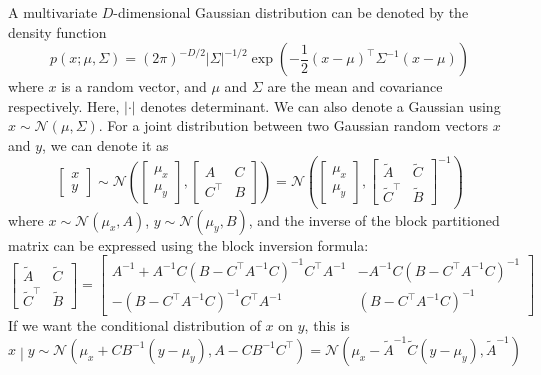 \documentclass[11pt]{report} %
\begin{document}
A multivariate $D$-dimensional Gaussian distribution can be denoted by the density function
\begin{equation}
p\left(x;\mu,\Sigma\right)=\left(2\pi\right)^{-D/2}\left|\Sigma\right|^{-1/2}\exp\left(-\dfrac{1}{2}\left(x-\mu\right)^{\top}\Sigma^{-1}\left(x-\mu\right)\right)
\end{equation}
where $x$ is a random vector, and $\mu$ and $\Sigma$ are the mean and covariance respectively. Here, $\left|\cdot\right|$ denotes determinant. We can also denote a Gaussian using $x\sim\mathcal{N}\left(\mu, \Sigma\right)$. For a joint distribution between two Gaussian random vectors $x$ and $y$, we can denote it as
\begin{equation}
\begin{bmatrix}x\\
y
\end{bmatrix}\sim\mathcal{N}\left(\begin{bmatrix}\mu_{x}\\
\mu_{y}
\end{bmatrix},\begin{bmatrix}A & C\\
C^{\top} & B
\end{bmatrix}\right)=\mathcal{N}\left(\begin{bmatrix}\mu_{x}\\
\mu_{y}
\end{bmatrix},\begin{bmatrix}\tilde{A} & \tilde{C}\\
\tilde{C}^{\top} & \tilde{B}
\end{bmatrix}^{-1}\right)
\end{equation}
where $x\sim\mathcal{N}\left(\mu_{x},A\right)$, $y\sim\mathcal{N}\left(\mu_{y},B\right)$, and the inverse of the block partitioned matrix can be expressed using the block inversion formula:
\begin{equation}
\begin{bmatrix}\tilde{A} & \tilde{C}\\
\tilde{C}^{\top} & \tilde{B}
\end{bmatrix}=\begin{bmatrix}A^{-1}+A^{-1}C\left(B-C^{\top}A^{-1}C\right)^{-1}C^{\top}A^{-1} & -A^{-1}C\left(B-C^{\top}A^{-1}C\right)^{-1}\\
-\left(B-C^{\top}A^{-1}C\right)^{-1}C^{\top}A^{-1} & \left(B-C^{\top}A^{-1}C\right)^{-1}
\end{bmatrix}
\end{equation}
If we want the conditional distribution of $x$ on $y$, this is
\begin{equation}
\left.x\middle|y\right.\sim\mathcal{N}\left(\mu_{x}+CB^{-1}\left(y-\mu_{y}\right),A-CB^{-1}C^{\top}\right) =\mathcal{N}\left(\mu_{x}-\tilde{A}^{-1}\tilde{C}\left(y-\mu_{y}\right),\tilde{A}^{-1}\right)
\end{equation}
\end{document}
